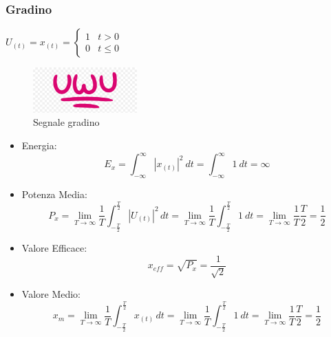        \pagebreak
        \subsubsection{Gradino}
        $U_{(t)} = x_{(t)} = 
            \begin{cases}
                1 & t > 0 \\
                0 & t \leq 0  
            \end{cases}
        $
        \begin{figure}[H]
            \centering
            \includegraphics[width=4cm]{media/uwu.png}
            \caption{Segnale gradino}
            \label{fig:segnale gradino}
            
        \end{figure}        

        \begin{itemize}
            \item {Energia:
                \[
                    E_{x} = \int_{-\infty}^{\infty} |x_{(t)}|^2 \ dt = \int_{-\infty}^{\infty} 1\ dt = \infty 
                \]
            }
            \item {Potenza Media:
                \[
                    P_{x} =\lim_{T\rightarrow\infty}  \frac{1}{T} \int_{-\frac{T}{2}}^{\frac{T}{2}}  |U_{(t)}|^2 \,dt =\lim_{T\rightarrow\infty} \frac{1}{T} \int_{-\frac{T}{2}}^{\frac{T}{2}} 1\ dt = \lim_{T\rightarrow\infty} \frac{1}{T} \frac{T}{2} = \frac{1}{2}
                \]
            }
            \item {Valore Efficace:
                \[
                    x_{eff} = \sqrt{P_{x}} = \frac{1}{\sqrt{2}} 
                \]
            }
            \item {Valore Medio:
                    \[x_{m} = \lim_{T\rightarrow\infty} \frac{1}{T} \int_{-\frac{T}{2}}^{\frac{T}{2}}  x_{(t)} \,dt =\lim_{T\rightarrow\infty} \frac{1}{T} \int_{-\frac{T}{2}}^{\frac{T}{2}} 1\ dt = \lim_{T\rightarrow\infty} \frac{1}{T} \frac{T}{2} = \frac{1}{2} \]
            }
        \end{itemize}
        
